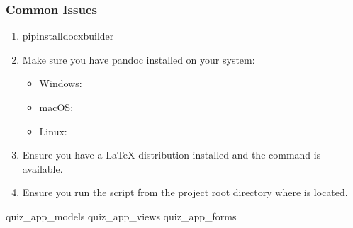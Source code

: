 \documentclass[letterpaper,10pt,english]{sphinxmanual}
\begin{document}
\subsubsection{Common Issues}
\label{\detokenize{documentation_workflow:common-issues}}\begin{enumerate}
%
\item {} 
\sphinxAtStartPar
{}

\begin{sphinxVerbatim}[commandchars=\\\{\}]
pipinstalldocxbuilder
\end{sphinxVerbatim}

\item {} 
\sphinxAtStartPar
{}

\sphinxAtStartPar
Make sure you have pandoc installed on your system:
\begin{itemize}
\item {} 
\sphinxAtStartPar
Windows: 

\item {} 
\sphinxAtStartPar
macOS: 

\item {} 
\sphinxAtStartPar
Linux: 

\end{itemize}

\item {} 
\sphinxAtStartPar
{}

\sphinxAtStartPar
Ensure you have a LaTeX distribution installed and the  command is available.

\item {} 
\sphinxAtStartPar
{}

\sphinxAtStartPar
Ensure you run the script from the project root directory where  is located.

\end{enumerate}
\begin{description}
\sphinxAtStartPar
quiz\_app\_models
quiz\_app\_views
quiz\_app\_forms

\end{description}
\end{document}
